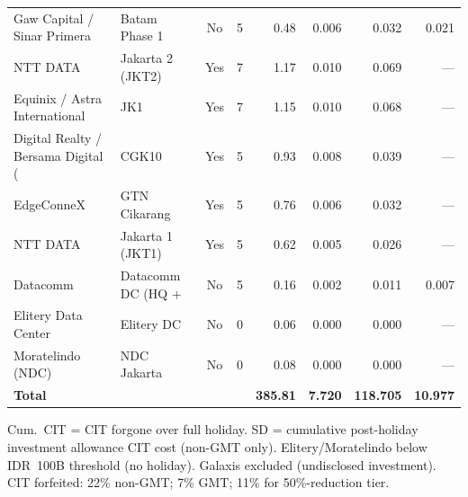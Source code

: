 \documentclass[11pt,english]{article}
\begin{document}
\begin{table}[H]
\begin{threeparttable}
\begin{tabular}{l l c r r r r r}
  Gaw Capital / Sinar Primera & Batam Phase 1 & No & 5 & 0.48 & 0.006 & 0.032 & 0.021 \\
  NTT DATA & Jakarta 2 (JKT2) & Yes & 7 & 1.17 & 0.010 & 0.069 & --- \\
  Equinix / Astra International & JK1 & Yes & 7 & 1.15 & 0.010 & 0.068 & --- \\
  Digital Realty / Bersama Digital ( & CGK10 & Yes & 5 & 0.93 & 0.008 & 0.039 & --- \\
  EdgeConneX & GTN Cikarang & Yes & 5 & 0.76 & 0.006 & 0.032 & --- \\
  NTT DATA & Jakarta 1 (JKT1) & Yes & 5 & 0.62 & 0.005 & 0.026 & --- \\
  Datacomm & Datacomm DC (HQ +  & No & 5 & 0.16 & 0.002 & 0.011 & 0.007 \\
  Elitery Data Center & Elitery DC & No & 0 & 0.06 & 0.000 & 0.000 & --- \\
  Moratelindo (NDC) & NDC Jakarta & No & 0 & 0.08 & 0.000 & 0.000 & --- \\
  \midrule
  \textbf{Total} & & & & \textbf{385.81} & \textbf{7.720} & \textbf{118.705} & \textbf{10.977} \\
\bottomrule
\end{tabular}
\begin{tablenotes}
\scriptsize
\item Cum.\ CIT = CIT forgone over full holiday. SD = cumulative post-holiday investment allowance CIT cost (non-GMT only). Elitery/Moratelindo below IDR~100B threshold (no holiday). Galaxis excluded (undisclosed investment). CIT forfeited: 22\% non-GMT; 7\% GMT; 11\% for 50\%-reduction tier.
\end{tablenotes}
\end{threeparttable}
\end{table}
\end{document}
